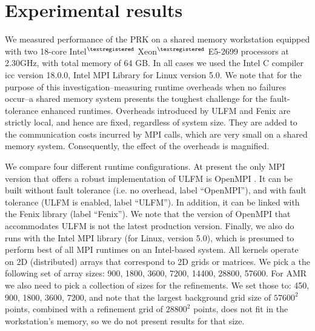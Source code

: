 \section{Experimental results}\label{sec:results}
We measured performance of the PRK on a shared memory workstation
equipped with two 18-core
Intel$\footnotesize{^{\textregistered}}$
Xeon$\footnotesize{^{\textregistered}}$ E5-2699 processors at 2.30GHz,
with total memory of 64 GB.
In all cases we used the Intel\regtm{} C compiler icc
version 18.0.0, Intel\regtm{} MPI Library for Linux version 5.0.
We note that for the purpose of this investigation--measuring runtime
overheads when no failures occur--a shared memory system
presents the toughest challenge for the fault-tolerance enhanced runtimes.
Overheads introduced by ULFM and Fenix are strictly local, and hence
are fixed, regardless of system size.
They are added to the communication costs incurred by MPI calls, which are
very small on a shared memory system.
Consequently, the effect of the overheads is magnified.

We compare four different runtime configurations.
At present the only MPI version that offers a robust implementation of ULFM
is OpenMPI \cite{openmpi}.
It can be built without fault tolerance (i.e. no overhead, label ``OpenMPI''), and with
fault tolerance (ULFM is enabled, label ``ULFM'').
In addition, it can be linked with the Fenix library (label ``Fenix'').
We note that the version of OpenMPI that accommodates ULFM is not the latest production
version.
Finally, we also do runs with the Intel\regtm{} MPI library (for Linux, version 5.0),
which is presumed to perform best of all MPI runtimes on an Intel-based system.
All kernels operate on 2D (distributed) arrays that correspond to 2D grids or matrices.
We pick a the following set of array sizes: 900, 1800, 3600, 7200, 14400, 28800,
57600.
For AMR we also need to pick a collection of sizes for the refinements.
We set those to: 450, 900, 1800, 3600, 7200, and note that the largest background
grid size of $57600^2$ points, combined with a refinement grid of $28800^2$
points, does not fit in the workstation's memory, so we do not present results
for that size.




